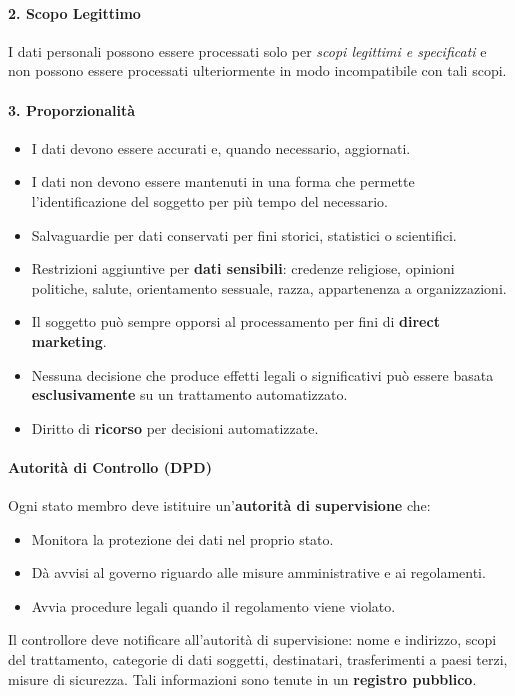 \documentclass[a4paper,11pt]{article}
\begin{document}
\paragraph{2. Scopo Legittimo}
I dati personali possono essere processati solo per \emph{scopi legittimi e specificati} e non possono essere processati ulteriormente in modo incompatibile con tali scopi.

\paragraph{3. Proporzionalit\`{a}}
\begin{itemize}
  \item I dati devono essere accurati e, quando necessario, aggiornati.
  \item I dati non devono essere mantenuti in una forma che permette l'identificazione del soggetto per pi\`{u} tempo del necessario.
  \item Salvaguardie per dati conservati per fini storici, statistici o scientifici.
  \item Restrizioni aggiuntive per \textbf{dati sensibili}: credenze religiose, opinioni politiche, salute, orientamento sessuale, razza, appartenenza a organizzazioni.
  \item Il soggetto pu\`{o} sempre opporsi al processamento per fini di \textbf{direct marketing}.
  \item Nessuna decisione che produce effetti legali o significativi pu\`{o} essere basata \textbf{esclusivamente} su un trattamento automatizzato.
  \item Diritto di \textbf{ricorso} per decisioni automatizzate.
\end{itemize}

\paragraph{Autorit\`{a} di Controllo (DPD)}
Ogni stato membro deve istituire un'\textbf{autorit\`{a} di supervisione} che:
\begin{itemize}
  \item Monitora la protezione dei dati nel proprio stato.
  \item D\`{a} avvisi al governo riguardo alle misure amministrative e ai regolamenti.
  \item Avvia procedure legali quando il regolamento viene violato.
\end{itemize}
Il controllore deve notificare all'autorit\`{a} di supervisione: nome e indirizzo, scopi del trattamento, categorie di dati soggetti, destinatari, trasferimenti a paesi terzi, misure di sicurezza. Tali informazioni sono tenute in un \textbf{registro pubblico}.
\end{document}
